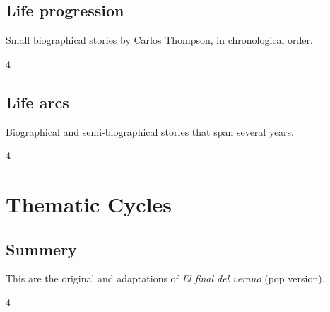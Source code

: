 \documentclass[a4paper,landscape]{memoir}
\begin{document}
\chapter{Life progression}
Small biographical stories by Carlos Thompson, in chronological order.
\clearpage\begin{multicols*}{4}


















\end{multicols*}

\chapter{Life arcs}
Biographical and semi-biographical stories that span several years.
\clearpage\begin{multicols*}{4}












\end{multicols*}

\part{Thematic Cycles}

\chapter{Summery}
This are the original and adaptations of \emph{El final del verano} (pop version).
\clearpage\begin{multicols*}{4}










\end{multicols*}
\end{document}
